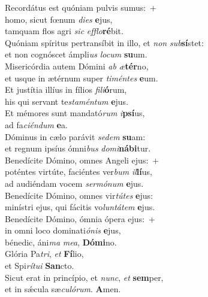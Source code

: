 \evenverse Recordátus est quóniam pulvis sumus:~+\\\evenverse  homo, sicut fœnum \textit{di}\textit{es} \textbf{e}jus,~\*\\
\evenverse tamquam flos agri \textit{sic} \textit{ef}\textit{flo}\textbf{ré}bit.\\
\oddverse Quóniam spíritus pertransíbit in illo, et \textit{non} \textit{sub}\textbf{sí}stet:~\*\\
\oddverse et non cognóscet ámpli\textit{us} \textit{lo}\textit{cum} \textbf{su}um.\\
\evenverse Misericórdia autem Dómini \textit{ab} \textit{æ}\textbf{tér}no,~\*\\
\evenverse et usque in ætérnum super \textit{ti}\textit{mén}\textit{tes} \textbf{e}um.\\
\oddverse Et justítia illíus in fílios \textit{fi}\textit{li}\textbf{ó}rum,~\*\\
\oddverse his qui servant te\textit{sta}\textit{mén}\textit{tum} \textbf{e}jus.\\
\evenverse Et mémores sunt mandató\textit{rum} \textit{i}\textbf{psí}us,~\*\\
\evenverse ad fa\textit{ci}\textit{én}\textit{dum} \textbf{e}a.\\
\oddverse Dóminus in cælo parávit \textit{se}\textit{dem} \textbf{su}am:~\*\\
\oddverse et regnum ipsíus ómni\textit{bus} \textit{do}\textit{mi}\textbf{ná}\textbf{bi}tur.\\
\evenverse Benedícite Dómino, omnes Angeli ejus:~+\\
\evenverse  poténtes virtúte, faciéntes ver\textit{bum} \textit{il}\textbf{lí}us,~\*\\
\evenverse ad audiéndam vocem \textit{ser}\textit{mó}\textit{num} \textbf{e}jus.\\
\oddverse Benedícite Dómino, omnes vir\textit{tú}\textit{tes} \textbf{e}jus:~\*\\
\oddverse minístri ejus, qui fácitis vo\textit{lun}\textit{tá}\textit{tem} \textbf{e}jus.\\
\evenverse Benedícite Dómino, ómnia ópera ejus:~+\\
\evenverse  in omni loco dominati\textit{ó}\textit{nis} \textbf{e}jus,~\*\\
\evenverse bénedic, áni\textit{ma} \textit{me}\textit{a}, \textbf{Dó}\textbf{mi}no.\\
\oddverse Glória Pa\textit{tri}, \textit{et} \textbf{Fí}lio,~\*\\
\oddverse et Spi\textit{rí}\textit{tu}\textit{i} \textbf{San}cto.\\
\evenverse Sicut erat in princípio, et \textit{nunc}, \textit{et} \textbf{sem}per,~\*\\
\evenverse et in sǽcula sæ\textit{cu}\textit{ló}\textit{rum}. \textbf{A}men.\\
